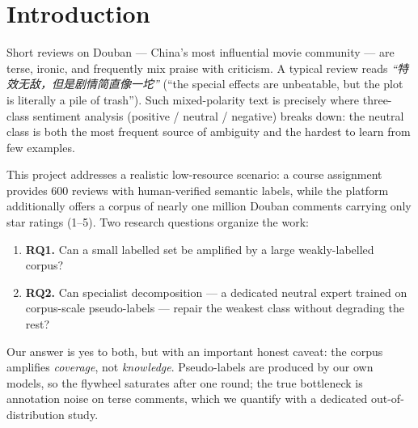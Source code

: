 \documentclass[11pt,a4paper]{article}
\begin{document}
\vspace{0.6em}

\newpage
\tableofcontents
\newpage

\section{Introduction}
\label{sec:intro}

Short reviews on Douban --- China's most influential movie community ---
are terse, ironic, and frequently mix praise with criticism. A typical
review reads \emph{``特效无敌，但是剧情简直像一坨''} (``the special
effects are unbeatable, but the plot is literally a pile of trash'').
Such mixed-polarity text is precisely where three-class sentiment
analysis (positive / neutral / negative) breaks down: the neutral class
is both the most frequent source of ambiguity and the hardest to learn
from few examples.

This project addresses a realistic low-resource scenario: a course
assignment provides 600 reviews with human-verified semantic labels,
while the platform additionally offers a corpus of nearly one million
Douban comments carrying only star ratings (1--5). Two research questions
organize the work:

\begin{enumerate}
  \item \textbf{RQ1.} Can a small labelled set be amplified by a large
        weakly-labelled corpus?
  \item \textbf{RQ2.} Can specialist decomposition --- a dedicated
        neutral expert trained on corpus-scale pseudo-labels --- repair
        the weakest class without degrading the rest?
\end{enumerate}

Our answer is yes to both, but with an important honest caveat: the
corpus amplifies \emph{coverage}, not \emph{knowledge}. Pseudo-labels are
produced by our own models, so the flywheel saturates after one round;
the true bottleneck is annotation noise on terse comments, which we
quantify with a dedicated out-of-distribution study.
\end{document}

